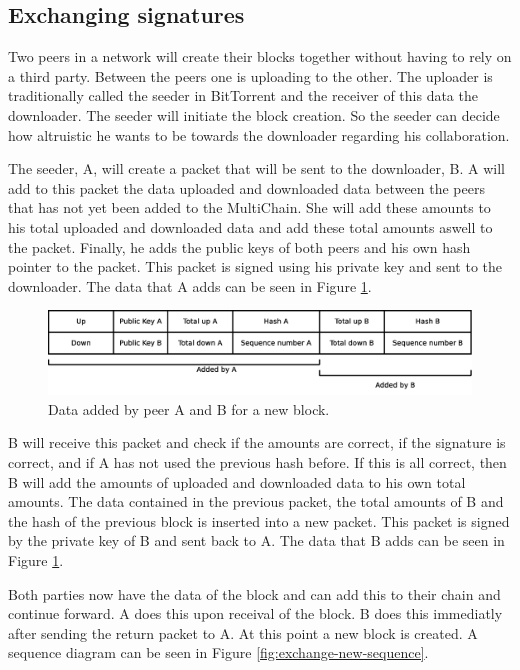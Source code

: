 \subsection{Exchanging signatures}
Two peers in a network will create their blocks together without having to rely on a third party.
Between the peers one is uploading to the other.
The uploader is traditionally called the seeder in BitTorrent and the receiver of this data the downloader\cite{Cohen-bittorrent}.
The seeder will initiate the block creation.
So the seeder can decide how altruistic he wants to be towards the downloader regarding his collaboration.

The seeder, A, will create a packet that will be sent to the downloader, B.
A will add to this packet the data uploaded and downloaded data between the peers
that has not yet been added to the MultiChain.
She will add these amounts to his total uploaded and downloaded data
and add these total amounts aswell to the packet.
Finally, he adds the public keys of both peers and his own hash pointer to the packet.
This packet is signed using his private key and sent to the downloader.
The data that A adds can be seen in Figure \ref{fig:packet-creation}.

\begin{figure}
	\centerline{\includegraphics[scale=0.3]{design/figs/packet_creation.eps}}
	\caption{Data added by peer A and B for a new block.}
	\label{fig:packet-creation}
\end{figure}

B will receive this packet and check if the amounts are correct, if the signature is correct,
and if A has not used the previous hash before.
If this is all correct,
then B will add the amounts of uploaded and downloaded data to his own total amounts.
The data contained in the previous packet, the total amounts of B and the hash of the previous block is
inserted into a new packet.
This packet is signed by the private key of B and sent back to A.
The data that B adds can be seen in Figure \ref{fig:packet-creation}.

Both parties now have the data of the block and can add this to their chain and continue forward.
A does this upon receival of the block.
B does this immediatly after sending the return packet to A.
At this point a new block is created.
A sequence diagram can be seen in Figure \ref{fig:exchange-new-sequence}.

